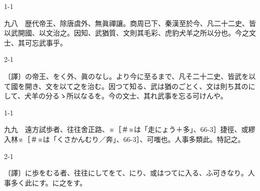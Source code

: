 \documentclass[tate,paper=b6j,jafontsize=9pt]{jlreq}
\begin{document}
\begin{azconvIndented}{1\zw}{-1\zw}

九八　歴代帝王、除唐虞外、無眞禪讓。商周已下、秦漢至於今、凡二十二史、皆以武開國、以文治之。因知、武猶質、文則其毛彩、虎豹犬羊之所以分也。今之文士、其可忘武事乎。

\end{azconvIndented}
\begin{azconvIndented}{2\zw}{-1\zw}

〔譯〕の帝王、をく外、眞のなし。より今に至るまで、凡そ二十二史、皆武を以て國を開き、文を以て之を治む。因つて知る、武は猶のごとく、文は則ち其のにして、犬羊の分るゝ所以なるを。今の文士、其れ武事を忘る可けんや。

\end{azconvIndented}

\begin{azconvIndented}{1\zw}{-1\zw}

九九　遠方試歩者、往往舍正路、※{\small ［＃※は「走にょう＋多」、66-3］}捷徑、或繆入林※{\small ［＃※は「くさかんむり／奔」、66-3］}、可嗤也。人事多類此。特記之。

\end{azconvIndented}
\begin{azconvIndented}{2\zw}{-1\zw}

〔譯〕に歩をむる者、往往にしてをて、にり、或はつてに入る、ふ可きなり。人事多く此にす。に之をす。

\end{azconvIndented}
\end{document}
